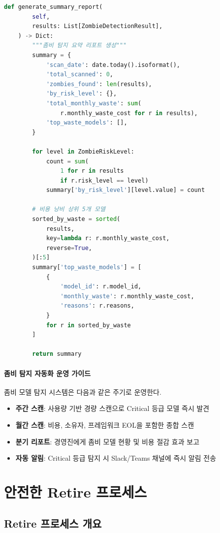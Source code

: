 \begin{lstlisting}[language=Python, caption={좀비 모델 탐지 자동화 시스템}, label={lst:zombie_detection}]
    def generate_summary_report(
        self,
        results: List[ZombieDetectionResult],
    ) -> Dict:
        """좀비 탐지 요약 리포트 생성"""
        summary = {
            'scan_date': date.today().isoformat(),
            'total_scanned': 0,
            'zombies_found': len(results),
            'by_risk_level': {},
            'total_monthly_waste': sum(
                r.monthly_waste_cost for r in results),
            'top_waste_models': [],
        }

        for level in ZombieRiskLevel:
            count = sum(
                1 for r in results
                if r.risk_level == level)
            summary['by_risk_level'][level.value] = count

        # 비용 낭비 상위 5개 모델
        sorted_by_waste = sorted(
            results,
            key=lambda r: r.monthly_waste_cost,
            reverse=True,
        )[:5]
        summary['top_waste_models'] = [
            {
                'model_id': r.model_id,
                'monthly_waste': r.monthly_waste_cost,
                'reasons': r.reasons,
            }
            for r in sorted_by_waste
        ]

        return summary
\end{lstlisting}

\paragraph{좀비 탐지 자동화 운영 가이드}
좀비 모델 탐지 시스템은 다음과 같은 주기로 운영한다.

\begin{itemize}
 \item \textbf{주간 스캔}: 사용량 기반 경량 스캔으로 Critical 등급 모델 즉시 발견
 \item \textbf{월간 스캔}: 비용, 소유자, 프레임워크 EOL을 포함한 종합 스캔
 \item \textbf{분기 리포트}: 경영진에게 좀비 모델 현황 및 비용 절감 효과 보고
 \item \textbf{자동 알림}: Critical 등급 탐지 시 Slack/Teams 채널에 즉시 알림 전송
\end{itemize}


\section{안전한 Retire 프로세스}
\label{sec:12.2}

\subsection{Retire 프로세스 개요}
\label{sec:12.2.1}

